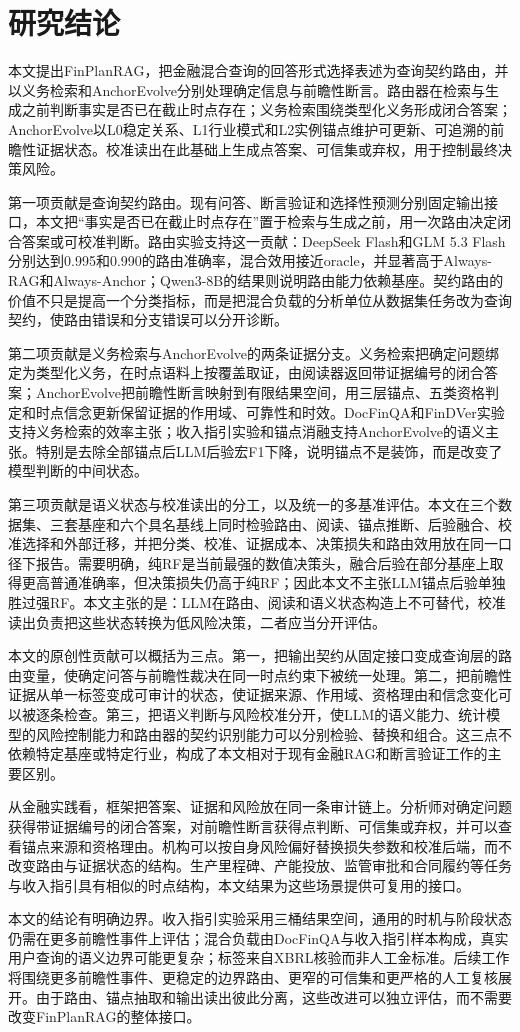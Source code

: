 \section{研究结论}

本文提出FinPlanRAG，把金融混合查询的回答形式选择表述为查询契约路由，并以义务检索和AnchorEvolve分别处理确定信息与前瞻性断言。路由器在检索与生成之前判断事实是否已在截止时点存在；义务检索围绕类型化义务形成闭合答案；AnchorEvolve以L0稳定关系、L1行业模式和L2实例锚点维护可更新、可追溯的前瞻性证据状态。校准读出在此基础上生成点答案、可信集或弃权，用于控制最终决策风险。

第一项贡献是查询契约路由。现有问答、断言验证和选择性预测分别固定输出接口，本文把“事实是否已在截止时点存在”置于检索与生成之前，用一次路由决定闭合答案或可校准判断。路由实验支持这一贡献：DeepSeek Flash和GLM 5.3 Flash分别达到0.995和0.990的路由准确率，混合效用接近oracle，并显著高于Always-RAG和Always-Anchor；Qwen3-8B的结果则说明路由能力依赖基座。契约路由的价值不只是提高一个分类指标，而是把混合负载的分析单位从数据集任务改为查询契约，使路由错误和分支错误可以分开诊断。

第二项贡献是义务检索与AnchorEvolve的两条证据分支。义务检索把确定问题绑定为类型化义务，在时点语料上按覆盖取证，由阅读器返回带证据编号的闭合答案；AnchorEvolve把前瞻性断言映射到有限结果空间，用三层锚点、五类资格判定和时点信念更新保留证据的作用域、可靠性和时效。DocFinQA和FinDVer实验支持义务检索的效率主张；收入指引实验和锚点消融支持AnchorEvolve的语义主张。特别是去除全部锚点后LLM后验宏F1下降，说明锚点不是装饰，而是改变了模型判断的中间状态。

第三项贡献是语义状态与校准读出的分工，以及统一的多基准评估。本文在三个数据集、三套基座和六个具名基线上同时检验路由、阅读、锚点推断、后验融合、校准选择和外部迁移，并把分类、校准、证据成本、决策损失和路由效用放在同一口径下报告。需要明确，纯RF是当前最强的数值决策头，融合后验在部分基座上取得更高普通准确率，但决策损失仍高于纯RF；因此本文不主张LLM锚点后验单独胜过强RF。本文主张的是：LLM在路由、阅读和语义状态构造上不可替代，校准读出负责把这些状态转换为低风险决策，二者应当分开评估。

本文的原创性贡献可以概括为三点。第一，把输出契约从固定接口变成查询层的路由变量，使确定问答与前瞻性裁决在同一时点约束下被统一处理。第二，把前瞻性证据从单一标签变成可审计的状态，使证据来源、作用域、资格理由和信念变化可以被逐条检查。第三，把语义判断与风险校准分开，使LLM的语义能力、统计模型的风险控制能力和路由器的契约识别能力可以分别检验、替换和组合。这三点不依赖特定基座或特定行业，构成了本文相对于现有金融RAG和断言验证工作的主要区别。

从金融实践看，框架把答案、证据和风险放在同一条审计链上。分析师对确定问题获得带证据编号的闭合答案，对前瞻性断言获得点判断、可信集或弃权，并可以查看锚点来源和资格理由。机构可以按自身风险偏好替换损失参数和校准后端，而不改变路由与证据状态的结构。生产里程碑、产能投放、监管审批和合同履约等任务与收入指引具有相似的时点结构，本文结果为这些场景提供可复用的接口。

本文的结论有明确边界。收入指引实验采用三桶结果空间，通用的时机与阶段状态仍需在更多前瞻性事件上评估；混合负载由DocFinQA与收入指引样本构成，真实用户查询的语义边界可能更复杂；标签来自XBRL核验而非人工金标准。后续工作将围绕更多前瞻性事件、更稳定的边界路由、更窄的可信集和更严格的人工复核展开。由于路由、锚点抽取和输出读出彼此分离，这些改进可以独立评估，而不需要改变FinPlanRAG的整体接口。
